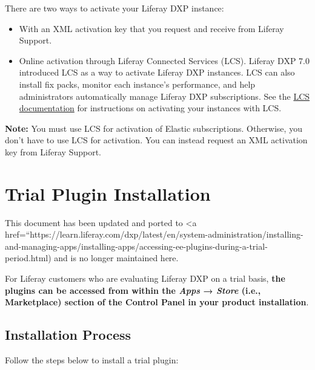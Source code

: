 There are two ways to activate your Liferay DXP instance:

\begin{itemize}
\item
  With an XML activation key that you request and receive from Liferay
  Support.
\item
  Online activation through Liferay Connected Services (LCS). Liferay
  DXP 7.0 introduced LCS as a way to activate Liferay DXP instances. LCS
  can also install fix packs, monitor each instance's performance, and
  help administrators automatically manage Liferay DXP subscriptions.
  See the
  \href{/docs/7-1/deploy/-/knowledge_base/d/managing-liferay-dxp-with-liferay-connected-services}{LCS
  documentation} for instructions on activating your instances with LCS.
\end{itemize}

\noindent\hrulefill

\textbf{Note:} You must use LCS for activation of Elastic subscriptions.
Otherwise, you don't have to use LCS for activation. You can instead
request an XML activation key from Liferay Support.

\noindent\hrulefill

\chapter{Trial Plugin Installation}\label{trial-plugin-installation}

{This document has been updated and ported to \textless a
href=``https://learn.liferay.com/dxp/latest/en/system-administration/installing-and-managing-apps/installing-apps/accessing-ee-plugins-during-a-trial-period.html)
and is no longer maintained here.}

For Liferay customers who are evaluating Liferay DXP on a trial basis,
\textbf{the plugins can be accessed from within the \emph{Apps} →
\emph{Store} (i.e., Marketplace) section of the Control Panel in your
product installation}.

\section{Installation Process}\label{installation-process}

Follow the steps below to install a trial plugin:

